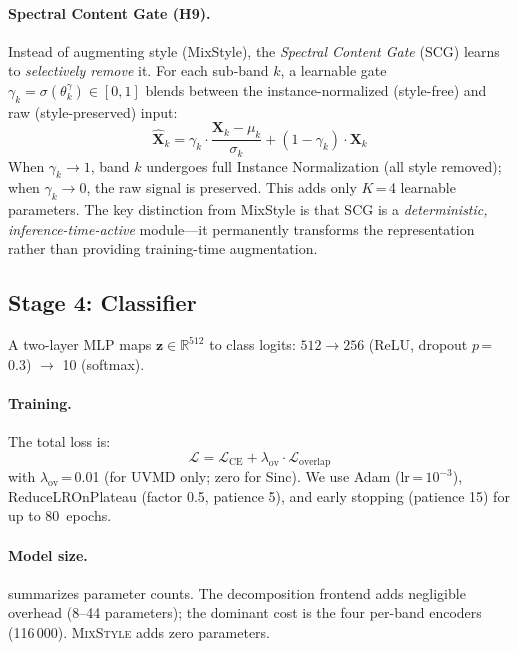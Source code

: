 \documentclass[conference]{IEEEtran}
\newcommand{\mixstyle}{\textsc{MixStyle}}
\newcommand{\uvmd}{\textsc{UVMD}}
\begin{document}
\paragraph{Spectral Content Gate (H9).}
Instead of augmenting style (MixStyle), the \emph{Spectral Content Gate} (SCG) learns to \emph{selectively remove} it.
For each sub-band $k$, a learnable gate $\gamma_k = \sigma(\theta_k^{\gamma}) \in [0, 1]$ blends between the instance-normalized (style-free) and raw (style-preserved) input:
\begin{equation}
\hat{\mathbf{X}}_k = \gamma_k \cdot \frac{\mathbf{X}_k - \mu_k}{\sigma_k} + (1 - \gamma_k) \cdot \mathbf{X}_k
\label{eq:scg}
\end{equation}
When $\gamma_k \to 1$, band $k$ undergoes full Instance Normalization (all style removed); when $\gamma_k \to 0$, the raw signal is preserved.
This adds only $K$\,=\,4 learnable parameters.
The key distinction from MixStyle is that SCG is a \emph{deterministic, inference-time-active} module---it permanently transforms the representation rather than providing training-time augmentation.

\subsection{Stage 4: Classifier}
A two-layer MLP maps $\mathbf{z} \in \mathbb{R}^{512}$ to class logits:
$512 \to 256$ (ReLU, dropout $p$\,=\,0.3) $\to$ 10 (softmax).

\paragraph{Training.}
The total loss is:
\begin{equation}
\mathcal{L} = \mathcal{L}_{\mathrm{CE}} + \lambda_{\mathrm{ov}} \cdot \mathcal{L}_{\mathrm{overlap}}
\end{equation}
with $\lambda_{\mathrm{ov}}$\,=\,0.01 (for \uvmd{} only; zero for Sinc).
We use Adam ($\mathrm{lr}$\,=\,$10^{-3}$), ReduceLROnPlateau (factor 0.5, patience 5), and early stopping (patience 15) for up to 80~epochs.

\paragraph{Model size.}
 summarizes parameter counts.
The decomposition frontend adds negligible overhead (8--44 parameters); the dominant cost is the four per-band encoders (116\,000).
\mixstyle{} adds zero parameters.
\end{document}
